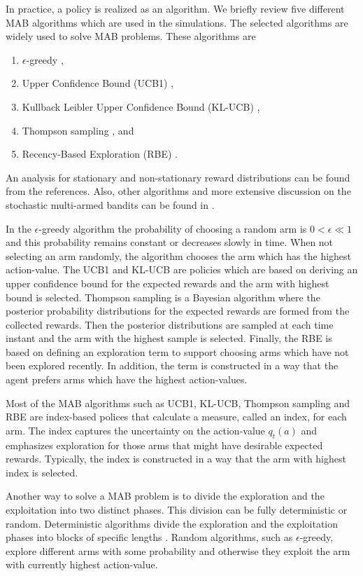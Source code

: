 \documentclass[conference]{IEEEtran}
\begin{document}
In practice, a policy is realized as an algorithm.
We briefly review five different MAB algorithms which are used in the simulations.
The selected algorithms are widely used to solve MAB problems.
These algorithms are
\begin{enumerate}
    \item $\epsilon$-greedy \cite{Sutton2018},
    \item Upper Confidence Bound (UCB1) \cite{Sutton2018, Garivier2008},
    \item Kullback Leibler Upper Confidence Bound (KL-UCB) \cite{Garivier2011},
    \item Thompson sampling \cite{agrawal2012, Raj2017}, and
    \item Recency-Based Exploration (RBE) \cite{Oksanen2015,Oksanen2017}.
\end{enumerate}
An analysis for stationary and non-stationary reward distributions can be found from the references.
Also, other algorithms and more extensive discussion on the stochastic multi-armed bandits can be found in \cite{Lattimore2019}.

In the $\epsilon$-greedy algorithm the probability of choosing a random arm is $0 < \epsilon \ll 1$ and this probability remains constant or decreases slowly in time.
When not selecting an arm randomly, the algorithm chooses the arm which has the highest action-value.
The UCB1 and KL-UCB are policies which are based on deriving an upper confidence bound for the expected rewards and the arm with highest bound is selected.
Thompson sampling is a Bayesian algorithm where the posterior probability distributions for the expected rewards are formed from the collected rewards.
Then the posterior distributions are sampled at each time instant and the arm with the highest sample is selected.
Finally, the RBE is based on defining an exploration term to support choosing arms which have not been explored recently.
In addition, the term is constructed in a way that the agent prefers arms which have the highest action-values.

Most of the MAB algorithms such as UCB1, KL-UCB, Thompson sampling and RBE are index-based polices that calculate a measure, called an index, for each arm.
The index captures the uncertainty on the action-value $q_t(a)$ and emphasizes exploration for those arms that might have desirable expected rewards.
Typically, the index is constructed in a way that the arm with highest index is selected.

Another way to solve a MAB problem is to divide the exploration and the exploitation into two distinct phases.
This division can be fully deterministic or random. 
Deterministic algorithms divide the exploration and the exploitation phases into blocks of specific lengths \cite{Lattimore2019}.
Random algorithms, such as $\epsilon$-greedy, explore different arms with some probability and otherwise they exploit the arm with currently highest action-value. 
\end{document}
